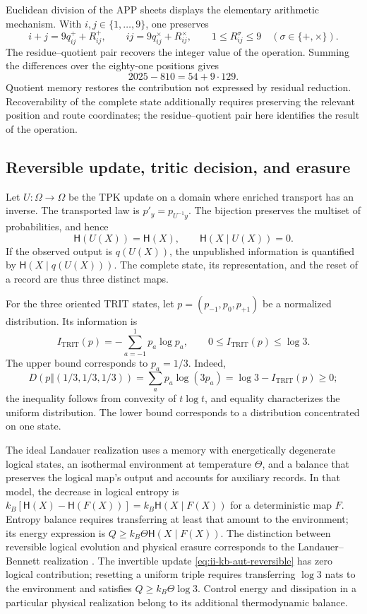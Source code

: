 Euclidean division of the APP sheets displays the elementary
arithmetic mechanism. With \(i,j\in\{1,\ldots,9\}\), one preserves
\[
 i+j=9q^+_{ij}+R^+_{ij},\qquad
 ij=9q^\times_{ij}+R^\times_{ij},\qquad
 1\leq R^\sigma_{ij}\leq9\quad(\sigma\in\{+,\times\}).
\]
The residue--quotient pair recovers the integer value of the operation.
Summing the differences over the eighty-one positions gives
\[
 2025-810=54+9\cdot129.
\]
Quotient memory restores the contribution not expressed by
residual reduction. Recoverability of the complete state additionally
requires preserving the relevant position and route coordinates;
the residue--quotient pair here identifies the result of the operation.

\subsection{Reversible update, tritic decision, and erasure}

Let \(U:\Omega\to\Omega\) be the TPK update on a domain where
enriched transport has an inverse. The transported law is
\(p'_y=p_{U^{-1}y}\). The bijection preserves the multiset of
probabilities, and hence
\begin{equation}
 \mathsf H(U(X))=\mathsf H(X),\qquad
 \mathsf H(X\mid U(X))=0.
 \label{eq:ii-kb-aut-reversible}
\end{equation}
If the observed output is \(q(U(X))\), the unpublished information
is quantified by \(\mathsf H(X\mid q(U(X)))\). The complete state,
its representation, and the reset of a record are thus three distinct maps.

For the three oriented TRIT states, let
\(p=(p_{-1},p_0,p_{+1})\) be a normalized distribution. Its information is
\begin{equation}
 I_{\mathrm{TRIT}}(p)=-\sum_{a=-1}^{1}p_a\log p_a,
 \qquad 0\leq I_{\mathrm{TRIT}}(p)\leq\log3.
 \label{eq:ii-kb-aut-trit}
\end{equation}
The upper bound corresponds to \(p_a=1/3\). Indeed,
\[
 D(p\Vert(1/3,1/3,1/3))
 =\sum_ap_a\log(3p_a)=\log3-I_{\mathrm{TRIT}}(p)\geq0;
\]
the inequality follows from convexity of \(t\log t\), and
equality characterizes the uniform distribution. The lower bound
corresponds to a distribution concentrated on one state.

The ideal Landauer realization uses a memory with energetically
degenerate logical states, an isothermal environment at temperature \(\Theta\),
and a balance that preserves the logical map's output and accounts for
auxiliary records. In that model, the decrease in logical entropy is
\(k_B[\mathsf H(X)-\mathsf H(F(X))]
=k_B\mathsf H(X\mid F(X))\) for a deterministic map \(F\).
Entropy balance requires transferring at least that amount to the environment;
its energy expression is \(Q\geq k_B\Theta\mathsf H(X\mid F(X))\).
The distinction between reversible logical evolution and physical erasure
corresponds to the Landauer--Bennett realization \cite{bennett2003}.
The invertible update
\eqref{eq:ii-kb-aut-reversible} has zero logical contribution; resetting
a uniform triple requires transferring \(\log3\) nats
to the environment and satisfies \(Q\geq k_B\Theta\log3\).
Control energy and dissipation in a particular physical
realization belong to its additional thermodynamic balance.


